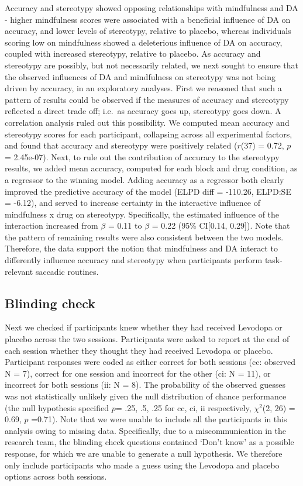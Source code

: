 \documentclass{article}
\begin{document}
Accuracy and stereotypy showed opposing relationships with mindfulness
and DA - higher mindfulness scores were associated with a beneficial
influence of DA on accuracy, and lower levels of stereotypy, relative to
placebo, whereas individuals scoring low on mindfulness showed a
deleterious influence of DA on accuracy, coupled with increased
stereotypy, relative to placebo. As accuracy and stereotypy are
possibly, but not necessarily related, we next sought to ensure that the
observed influences of DA and mindfulness on stereotypy was not being
driven by accuracy, in an exploratory analyses. First we reasoned that
such a pattern of results could be observed if the measures of accuracy
and stereotypy reflected a direct trade off; i.e.~as accuracy goes up,
stereotypy goes down. A correlation analysis ruled out this possibility.
We computed mean accuracy and stereotypy scores for each participant,
collapsing across all experimental factors, and found that accuracy and
stereotypy were positively related (\(r\)(37) = 0.72, \(p\) = 2.45e-07).
Next, to rule out the contribution of accuracy to the stereotypy
results, we added mean accuracy, computed for each block and drug
condition, as a regressor to the winning model. Adding accuracy as a
regressor both clearly improved the predictive accuracy of the model
(ELPD diff = -110.26, ELPD:SE = -6.12), and served to increase certainty
in the interactive influence of mindfulness x drug on stereotypy.
Specifically, the estimated influence of the interaction increased from
\(\beta\) = 0.11 to \(\beta\) = 0.22 (95\% CI{[}0.14, 0.29{]}). Note
that the pattern of remaining results were also consistent between the
two models. Therefore, the data support the notion that mindfulness and
DA interact to differently influence accuracy and stereotypy when
participants perform task-relevant saccadic routines.

\hypertarget{blinding-check}{%
\subsection{Blinding check}\label{blinding-check}}

Next we checked if participants knew whether they had received Levodopa
or placebo across the two sessions. Participants were asked to report at
the end of each session whether they thought they had received Levodopa
or placebo. Participant responses were coded as either correct for both
sessions (cc: observed N = 7), correct for one session and incorrect for
the other (ci: N = 11), or incorrect for both sessions (ii: N = 8). The
probability of the observed guesses was not statistically unlikely given
the null distribution of chance performance (the null hypothesis
specified \(p\)= .25, .5, .25 for cc, ci, ii respectively, \(\chi^2\)(2,
26) = 0.69, \(p\) =0.71). Note that we were unable to include all the
participants in this analysis owing to missing data. Specifically, due
to a miscommunication in the research team, the blinding check questions
contained `Don't know' as a possible response, for which we are unable
to generate a null hypothesis. We therefore only include participants
who made a guess using the Levodopa and placebo options across both
sessions.
\end{document}
